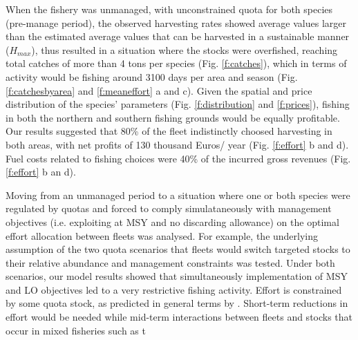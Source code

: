 \documentclass[12pt,oneline,a4paper,numbib]{ouparticle}
\numberwithin{equation}{subsection} %
\begin{document}
When the fishery was unmanaged, with unconstrained quota for both species (pre-manage period), the observed harvesting rates showed average values larger than the estimated average values that can be harvested in a sustainable manner ($H_{max}$), thus resulted in a situation where the stocks were overfished, reaching total catches of more than 4 tons per species (Fig. \ref{f:catches}), which in terms of activity would be fishing around 3100 days per area and season (Fig. \ref{f:catchesbyarea} and \ref{f:meaneffort} a and c). Given the spatial and price distribution of the species' parameters (Fig. \ref{f:distribution} and  \ref{f:prices}), fishing in both the northern and southern fishing grounds would be equally profitable. Our results suggested that 80\% of the fleet  indistinctly choosed harvesting in both areas, with net profits of 130 thousand Euros/ year (Fig. \ref{f:effort} b and d). Fuel costs related to fishing choices were 40\% of the incurred gross revenues (Fig. \ref{f:effort} b an d).

Moving from an unmanaged period to a situation where one or both species were regulated by quotas and forced to comply simulataneously with management objectives (i.e. exploiting at MSY and no discarding allowance) on the optimal effort allocation between fleets was analysed. For example, the underlying assumption of the two quota scenarios that fleets would switch targeted stocks to their relative abundance and management constraints was tested. Under both scenarios, our model results showed that simultaneously implementation of MSY and LO objectives led to a very restrictive fishing activity. Effort is constrained by some quota stock, as predicted in general terms by \cite{Ulrich2017}. Short-term reductions in effort would be needed while mid-term interactions between fleets and stocks that occur in mixed fisheries such as t

\end{document}
